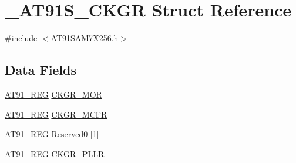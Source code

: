 \hypertarget{struct__AT91S__CKGR}{\section{\-\_\-\-A\-T91\-S\-\_\-\-C\-K\-G\-R Struct Reference}
\label{struct__AT91S__CKGR}
}


{\ttfamily \#include $<$A\-T91\-S\-A\-M7\-X256.\-h$>$}

\subsection*{Data Fields}
\begin{DoxyCompactItemize}
\item 
\hyperlink{GCC_2ARM7__AT91SAM7S_2AT91SAM7X256_8h_a712ad5a1ac1bd02f3e95a7526c283ce1}{A\-T91\-\_\-\-R\-E\-G} \hyperlink{struct__AT91S__CKGR_ab4c63bf05ff53bad7f78ed2ffee2c7c4}{C\-K\-G\-R\-\_\-\-M\-O\-R}
\item 
\hyperlink{GCC_2ARM7__AT91SAM7S_2AT91SAM7X256_8h_a712ad5a1ac1bd02f3e95a7526c283ce1}{A\-T91\-\_\-\-R\-E\-G} \hyperlink{struct__AT91S__CKGR_abba73a5875971576af24c443dca3703c}{C\-K\-G\-R\-\_\-\-M\-C\-F\-R}
\item 
\hyperlink{GCC_2ARM7__AT91SAM7S_2AT91SAM7X256_8h_a712ad5a1ac1bd02f3e95a7526c283ce1}{A\-T91\-\_\-\-R\-E\-G} \hyperlink{struct__AT91S__CKGR_a3c4048178d861a2361da69de58886823}{Reserved0} \mbox{[}1\mbox{]}
\item 
\hyperlink{GCC_2ARM7__AT91SAM7S_2AT91SAM7X256_8h_a712ad5a1ac1bd02f3e95a7526c283ce1}{A\-T91\-\_\-\-R\-E\-G} \hyperlink{struct__AT91S__CKGR_a8ab395fa84b6a94bd6df0ab1aafc42ab}{C\-K\-G\-R\-\_\-\-P\-L\-L\-R}
\end{DoxyCompactItemize}


